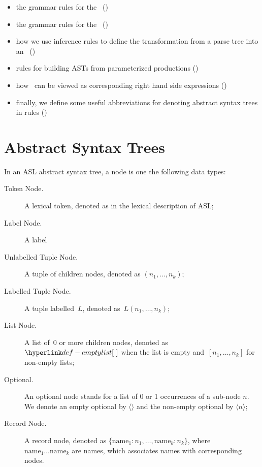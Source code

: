 \begin{itemize}
\item the grammar rules for the \untypedast\ ()
\item the grammar rules for the \typedast\ ()
\item how we use inference rules to define the transformation from a parse tree into an \untypedast\ ()
\item rules for building ASTs from parameterized productions ()
\item how \assignableexpressions\ can be viewed as corresponding right hand side expressions ()
\item finally, we define some useful abbreviations for denoting abstract syntax trees in rules ()
\end{itemize}

\section{Abstract Syntax Trees\label{sec:AbstractSyntaxTrees}}

In an ASL abstract syntax tree, a node is one the following data types:
\begin{description}
\item[Token Node.] A lexical token, denoted as in the lexical description of ASL;
\item[Label Node.] A label
\item[Unlabelled Tuple Node.] A tuple of children nodes, denoted as $(n_1,\ldots,n_k)$;
\item[Labelled Tuple Node.] A tuple labelled~$L$, denoted as~$L(n_1,\ldots,n_k)$;
\item[List Node.] A list of~$0$ or more children nodes, denoted as~$\emptylist$
      when the list is empty and~$[n_1,\ldots,n_k]$ for non-empty lists;
\item[Optional.] An optional node stands for a list of 0 or 1 occurrences of a sub-node $n$. We denote an empty optional by $\langle\rangle$ and the non-empty optional by $\langle n \rangle$;
\item[Record Node.] A record node, denoted as $\{\text{name}_1 : n_1,\ldots,\text{name}_k : n_k\}$, where \\
      $\text{name}_1 \ldots \text{name}_k$ are names, which associates names with corresponding nodes.
\end{description}

